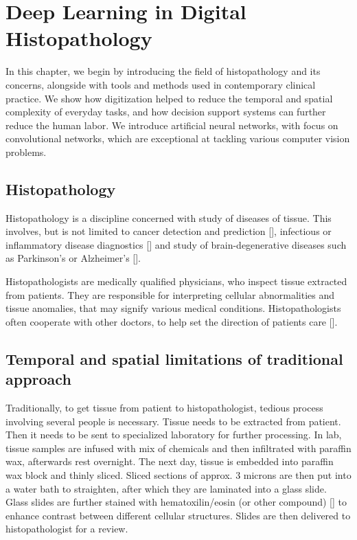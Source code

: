 \chapter{Deep Learning in Digital Histopathology}

In this chapter, we begin by introducing the field of histopathology and its concerns, alongside with tools and methods used in contemporary clinical practice. We show how digitization helped to reduce the temporal and spatial complexity of everyday tasks, and how decision support systems can further reduce the human labor. We introduce artificial neural networks, with focus on convolutional networks, which are exceptional at tackling various computer vision problems.

\section{Histopathology}

Histopathology is a discipline concerned with study of diseases of tissue. This involves, but is not limited to cancer detection and prediction [], infectious or inflammatory disease diagnostics [] and study of brain-degenerative diseases such as Parkinson's or Alzheimer's [].

Histopathologists are medically qualified physicians, who inspect tissue extracted from patients. They are responsible for interpreting cellular abnormalities and tissue anomalies, that may signify various medical conditions. Histopathologists often cooperate with other doctors, to help set the direction of patients care [].

\section{Temporal and spatial limitations of traditional approach}

Traditionally, to get tissue from patient to histopathologist, tedious process involving several people is necessary. Tissue needs to be extracted from patient. Then it needs to be sent to specialized laboratory for further processing. In lab, tissue samples are infused with mix of chemicals and then infiltrated with paraffin wax, afterwards rest overnight. The next day, tissue is embedded into paraffin wax block and thinly sliced. Sliced sections of approx. $3$ microns are then put into a water bath to straighten, after which they are laminated into a glass slide. Glass slides are further stained with hematoxilin/eosin (or other compound) [] to enhance contrast between different cellular structures. Slides are then delivered to histopathologist for a review.

